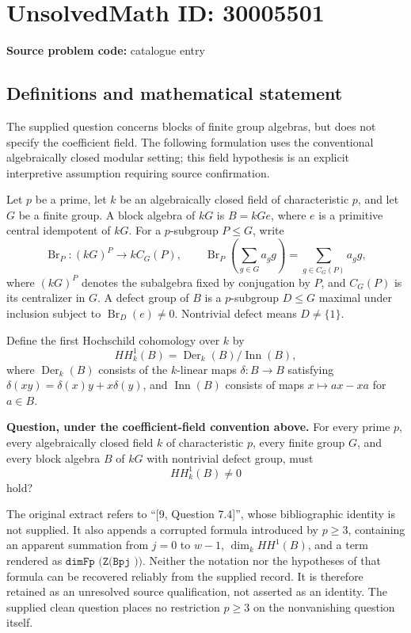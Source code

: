 \documentclass[11pt]{article}
\begin{document}
\section*{UnsolvedMath ID: 30005501}
\textbf{Source problem code:} catalogue entry
\subsection{Definitions and mathematical statement}
The supplied question concerns blocks of finite group algebras, but does not specify the coefficient field. The following formulation uses the conventional algebraically closed modular setting; this field hypothesis is an explicit interpretive assumption requiring source confirmation.

Let \(p\) be a prime, let \(k\) be an algebraically closed field of characteristic \(p\), and let \(G\) be a finite group. A block algebra of \(kG\) is \(B=kGe\), where \(e\) is a primitive central idempotent of \(kG\). For a \(p\)-subgroup \(P\leq G\), write
\[
\operatorname{Br}_P:(kG)^P\longrightarrow kC_G(P),\qquad
\operatorname{Br}_P\!\left(\sum_{g\in G}a_g g\right)=\sum_{g\in C_G(P)}a_g g,
\]
where \((kG)^P\) denotes the subalgebra fixed by conjugation by \(P\), and \(C_G(P)\) is its centralizer in \(G\). A defect group of \(B\) is a \(p\)-subgroup \(D\leq G\) maximal under inclusion subject to \(\operatorname{Br}_D(e)\neq0\). Nontrivial defect means \(D\neq\{1\}\).

Define the first Hochschild cohomology over \(k\) by
\[
HH^1_k(B)=\operatorname{Der}_k(B)/\operatorname{Inn}(B),
\]
where \(\operatorname{Der}_k(B)\) consists of the \(k\)-linear maps \(\delta:B\to B\) satisfying \(\delta(xy)=\delta(x)y+x\delta(y)\), and \(\operatorname{Inn}(B)\) consists of maps \(x\mapsto ax-xa\) for \(a\in B\).

\textbf{Question, under the coefficient-field convention above.} For every prime \(p\), every algebraically closed field \(k\) of characteristic \(p\), every finite group \(G\), and every block algebra \(B\) of \(kG\) with nontrivial defect group, must
\[
HH^1_k(B)\neq0
\]
hold?

The original extract refers to ``[9, Question 7.4]'', whose bibliographic identity is not supplied. It also appends a corrupted formula introduced by \(p\geq3\), containing an apparent summation from \(j=0\) to \(w-1\), \(\dim_k HH^1(B)\), and a term rendered as \(\texttt{dimFp (Z(Bpj ))}\). Neither the notation nor the hypotheses of that formula can be recovered reliably from the supplied record. It is therefore retained as an unresolved source qualification, not asserted as an identity. The supplied clean question places no restriction \(p\geq3\) on the nonvanishing question itself.
\end{document}
